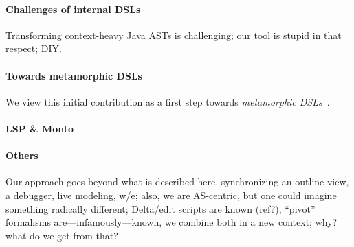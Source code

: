 \paragraph{Challenges of internal DSLs}
Transforming context-heavy Java ASTs is challenging; our tool is stupid in that respect; DIY.

\paragraph{Towards metamorphic DSLs}
We view this initial contribution as a first step towards \emph{metamorphic DSLs}~\cite{acher2014metamorphic}.

\paragraph{LSP \& Monto}


\paragraph{Others}
Our approach goes beyond what is described here. \eg synchronizing an outline view, a debugger, live modeling, w/e; also, we are AS-centric, but one could imagine something radically different;
Delta/edit scripts are known (ref?), ``pivot'' formalisms are---infamously---known, we combine both in a new context; why? what do we get from that?
